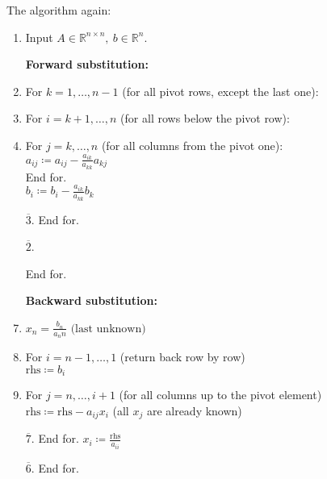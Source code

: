 The algorithm again:
\begin{enumerate}
    \item {
        Input $A \in \mathbb{R}^{n \times n},\ b \in \mathbb{R}^n$.

        \textbf{Forward substitution:}
    }
    \item {
        For $k = 1, \dots, n - 1$ (for all pivot rows, except the last one):
    }
    \item {
        \hspace*{0.5cm}  For $i = k + 1, \dots, n$ (for all rows below the pivot row):
    }
    \item {
        \hspace*{1cm}  For $j = k, \dots, n$ (for all columns from the pivot one):\\
        \hspace*{1.5cm} $
            a_{ij} \coloneqq a_{ij} - \frac{a_{ik}}{a_{kk}} a_{kj}
        $\\
        \hspace*{1cm} End for.\\
        \hspace*{1cm} $
            b_i \coloneqq b_i - \frac{a_{ik}}{a_{kk}} b_k
        $
    }
    \item[$\overline{3}$.] {
        \hspace*{0.5cm} End for.
    }
    \item[$\overline{2}$.] {
        End for.

        \textbf{Backward substitution:}
    }
    \item {
        $
            x_n = \frac{b_n}{a_nn} \text{ (last unknown)}
        $
    }
    \item {
        For $i = n-1, \dots, 1$ (return back row by row)\\
        \hspace*{0.5cm} $\mathrm{rhs} \coloneqq b_i$
    }
    \item {
        \hspace*{0.5cm}  For $j = n, \dots, i + 1$ (for all columns up to the pivot element)\\
        \hspace*{1cm}  $\mathrm{rhs} \coloneqq \mathrm{rhs} - a_{ij} x_i$ (all $x_j$ are already known)
    }
    \item[$\overline{7}$.] {
        \hspace*{0.5cm} End for.
        \hspace*{0.5cm} $x_i \coloneqq \frac{\mathrm{rhs}}{a_{ii}}$
    }
    \item[$\overline{6}$.] {
        End for.
    }
\end{enumerate}
